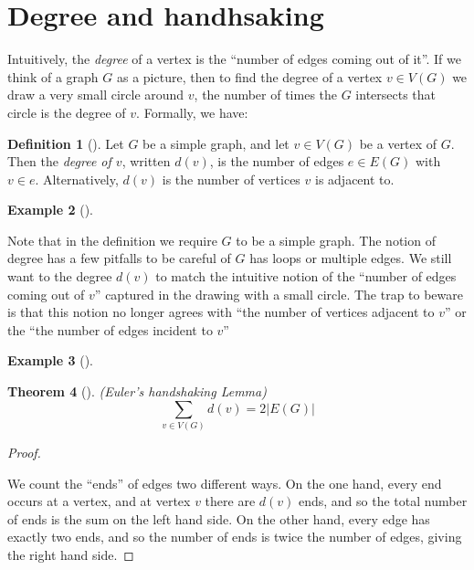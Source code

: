 \documentclass[10pt,]{book}
\theoremstyle{plain}
\newtheorem{theorem}{Theorem}[section]
\theoremstyle{definition}
\newtheorem{definition}[theorem]{Definition}
\theoremstyle{definition}
\newtheorem{example}[theorem]{Example}
\begin{document}
\section[{Degree and handhsaking}]{Degree and handhsaking}\label{s_intro_degrees}
\hypertarget{p-12}{}%
Intuitively, the \emph{degree} of a vertex is the ``number of edges coming out of it''. If we think of a graph \(G\) as a picture, then to find the degree of a vertex \(v\in V(G)\) we draw a very small circle around \(v\), the number of times the \(G\) intersects that circle is the degree of \(v\).  Formally, we have:%
\begin{definition}[{}]\label{definition-2}
\hypertarget{p-13}{}%
Let \(G\) be a simple graph, and let \(v\in V(G)\) be a vertex of \(G\).  Then the \emph{degree of \(v\)}, written \(d(v)\), is the number of edges \(e\in E(G)\) with \(v\in e\). Alternatively, \(d(v)\) is the number of vertices \(v\) is adjacent to.%
\end{definition}
\begin{example}[]\label{example-2}
\end{example}
\hypertarget{p-14}{}%
Note that in the definition we require \(G\) to be a simple graph.  The notion of degree has a few pitfalls to be careful of \(G\) has loops or multiple edges.  We still want to the degree \(d(v)\) to match the intuitive notion of the ``number of edges coming out of \(v\)'' captured in the drawing with a small circle.  The trap to beware is that this notion no longer agrees with ``the number of vertices adjacent to \(v\)'' or the ``the number of edges incident to \(v\)''%
\begin{example}[]\label{example-3}
\end{example}
\begin{theorem}[{}]\label{theorem-1}
\hypertarget{p-15}{}%
(Euler's handshaking Lemma)%
%
\begin{equation*}
\sum_{v\in V(G)}d(v)=2|E(G)|
\end{equation*}
\end{theorem}
\begin{proof}\hypertarget{proof-1}{}
\hypertarget{p-16}{}%
We count the ``ends'' of edges two different ways.  On the one hand, every end occurs at a vertex, and at vertex \(v\) there are \(d(v)\) ends, and so the total number of ends is the sum on the left hand side. On the other hand, every edge has exactly two ends, and so the number of ends is twice the number of edges, giving the right hand side.%
\end{proof}
\end{document}
